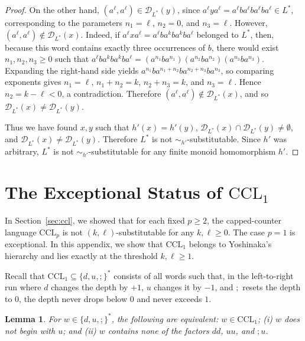 \documentclass[11pt,a4paper]{article}
\newtheorem{lemma}[theorem]{Lemma}
\newcommand{\D}{\mathcal{D}}
\begin{document}
\begin{proof}
On the other hand, $(a^\ell,a^\ell)\in\D_{L^*}(y)$, since $a^\ell y a^\ell=a^\ell ba^\ell ba^\ell ba^\ell\in L^*$, corresponding to the parameters $n_1=\ell$, $n_2=0$, and $n_3=\ell$. However, $(a^\ell,a^\ell)\notin\D_{L^*}(x)$. Indeed, if $a^\ell x a^\ell=a^\ell ba^kba^kba^\ell$ belonged to $L^*$, then, because this word contains exactly three occurrences of $b$, there would exist $n_1,n_2,n_3\ge0$ such that $a^\ell ba^kba^kba^\ell=(a^{n_1}ba^{n_1})(a^{n_2}ba^{n_2})(a^{n_3}ba^{n_3})$. Expanding the right-hand side yields $a^{n_1}ba^{n_1+n_2}ba^{n_2+n_3}ba^{n_3}$, so comparing exponents gives $n_1=\ell$, $n_1+n_2=k$, $n_2+n_3=k$, and $n_3=\ell$. Hence $n_2=k-\ell<0$, a contradiction. Therefore $(a^\ell,a^\ell)\notin\D_{L^*}(x)$, and so $\D_{L^*}(x)\neq\D_{L^*}(y)$.

Thus we have found $x,y$ such that $h'(x)=h'(y)$, $\D_{L^*}(x)\cap\D_{L^*}(y)\neq\emptyset$, and $\D_{L^*}(x)\neq\D_{L^*}(y)$. Therefore $L^*$ is not $\sim_{h'}$-substitutable. Since $h'$ was arbitrary, $L^*$ is not $\sim_{h'}$-substitutable for any finite monoid homomorphism $h'$.
\end{proof}

\section{The Exceptional Status of \texorpdfstring{$\mathrm{CCL}_1$}{CCL1}}
\label{app:ccl1}

In Section~\ref{sec:ccl}, we showed that for each fixed $p\ge2$, the capped-counter language $\mathrm{CCL}_p$ is not $(k,\ell)$-substitutable for any $k,\ell\ge0$. The case $p=1$ is exceptional. In this appendix, we show that $\mathrm{CCL}_1$ belongs to Yoshinaka's hierarchy and lies exactly at the threshold $k,\ell\ge1$.

Recall that $\mathrm{CCL}_1\subseteq\{d,u,;\}^*$ consists of all words such that, in the left-to-right run where $d$ changes the depth by $+1$, $u$ changes it by $-1$, and $;$ resets the depth to $0$, the depth never drops below $0$ and never exceeds $1$.

\begin{lemma}\label{lem:ccl1-local}
For $w\in\{d,u,;\}^*$, the following are equivalent: $w\in\mathrm{CCL}_1$; \textup{(i)} $w$ does not begin with $u$; and \textup{(ii)} $w$ contains none of the factors $dd$, $uu$, and $;u$.
\end{lemma}
\end{document}
